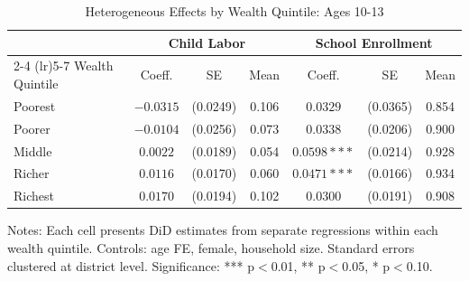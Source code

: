 \begin{table}[H]
\centering
\caption{Heterogeneous Effects by Wealth Quintile: Ages 10-13}
\label{tab:wealth_hetero}
\begin{threeparttable}
\begin{tabular}{lcccccc}
\toprule
& \multicolumn{3}{c}{Child Labor} & \multicolumn{3}{c}{School Enrollment} \\
\cmidrule(lr){2-4} \cmidrule(lr){5-7}
Wealth Quintile & Coeff. & SE & Mean & Coeff. & SE & Mean \\
\midrule
Poorest & $-0.0315$ & (0.0249) & 0.106 & $0.0329$ & (0.0365) & 0.854 \\
Poorer & $-0.0104$ & (0.0256) & 0.073 & $0.0338$ & (0.0206) & 0.900 \\
Middle & $0.0022$ & (0.0189) & 0.054 & $0.0598***$ & (0.0214) & 0.928 \\
Richer & $0.0116$ & (0.0170) & 0.060 & $0.0471***$ & (0.0166) & 0.934 \\
Richest & $0.0170$ & (0.0194) & 0.102 & $0.0300$ & (0.0191) & 0.908 \\
\bottomrule
\end{tabular}
\begin{tablenotes}
\footnotesize
\item Notes: Each cell presents DiD estimates from separate regressions within each wealth quintile. Controls: age FE, female, household size. Standard errors clustered at district level. Significance: *** p$<$0.01, ** p$<$0.05, * p$<$0.10.
\end{tablenotes}
\end{threeparttable}
\end{table}